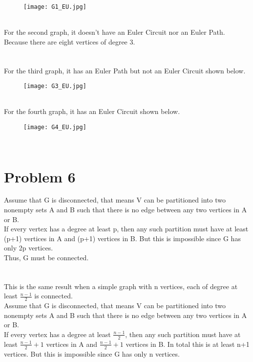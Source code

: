 \documentclass{article}
\begin{document}
\begin{figure}[H]
\centering
\texttt{[image: G1\_EU.jpg]}
\end{figure}\\
For the second graph, it doesn't have an Euler Circuit nor an Euler Path. Because there are eight vertices of degree 3.\\
\\ \hspace*{\fill} \\
For the third graph, it has an Euler Path but not an Euler Circuit shown below.\\
\begin{figure}[H]
\centering
\texttt{[image: G3\_EU.jpg]}
\end{figure}\\
For the fourth graph, it has an Euler Circuit shown below.\\
\begin{figure}[H]
\centering
\texttt{[image: G4\_EU.jpg]}
\end{figure}\\
\section{Problem 6}
Assume that G is disconnected, that means V can be partitioned into two nonempty sets A and B such that there is no edge between any two vertices in A or B.\\
If every vertex has a degree at least p, then any such partition must have at least (p+1) vertices in A and (p+1) vertices in B. But this is impossible since G has only 2p vertices.\\
Thus, G must be connected.\\
\\ \hspace*{\fill} \\
This is the same result when a simple graph with n vertices, each of degree at least $\frac{n-1}{2}$ is connected.\\
Assume that G is disconnected, that means V can be partitioned into two nonempty sets A and B such that there is no edge between any two vertices in A or B.\\
If every vertex has a degree at least $\frac{n-1}{2}$, then any such partition must have at least $\frac{n-1}{2} + 1$ vertices in A and $\frac{n-1}{2} + 1$ vertices in B. In total this is at least n+1 vertices. But this is impossible since G has only n vertices.\\
\end{document}
